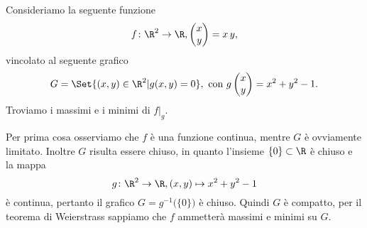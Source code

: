 \begin{ese}
	Consideriamo la seguente funzione
	\[
		f\colon\R^2\to \R,
		\begin{pmatrix}
			x \\
			y
		\end{pmatrix}
		= x\,y,
	\]
	vincolato al seguente grafico
	\[
		G=\Set{(x,y)\in\R^2 | g(x,y)=0},\text{ con }g
		\begin{pmatrix}
			x \\
			y
		\end{pmatrix}
		=x^2+y^2-1.
	\]
	Troviamo i massimi e i minimi di \(f|_g\).

	Per prima cosa osserviamo che \(f\) è una funzione continua, mentre \(G\) è ovviamente limitato.
	Inoltre \(G\) risulta essere chiuso, in quanto l'insieme \(\{0\}\subset\R\) è chiuso e la mappa
	\[
		g\colon \R^2\to\R,(x,y)\mapsto x^2+y^2-1
	\]
	è continua, pertanto il grafico \(G=g^{-1}\big(\{0\}\big)\) è chiuso.
	Quindi \(G\) è compatto, per il teorema di Weierstrass sappiamo che \(f\) ammetterà massimi e minimi su \(G\).


\end{ese}
